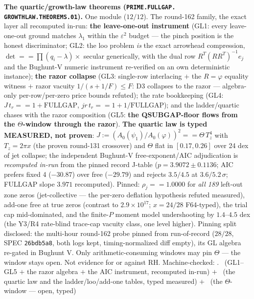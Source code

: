 \par\smallskip\noindent\textbf{The quartic/growth-law theorems
(\texttt{PRIME.\allowbreak FULLGAP.\allowbreak
GROWTHLAW.\allowbreak THEOREMS.01}).}
One module ($12/12$).  The round-162 family, the exact layer all
recomputed in-run: \textbf{the leave-one-out instrument} (GL1:
every leave-one-out ground matches $\lambda_1$ within the
$\varepsilon^2$ budget --- the pinch position is the honest
discriminator; GL2: the loo problem \emph{is} the exact arrowhead
compression, $\det == \prod(q_i - \lambda) \times$ secular
generically, with the dual row $R^T(RR^T)^{-1}e_j$ and the
Bughunt-V numeric instrument re-verified on an own deterministic
instance); \textbf{the razor collapse} (GL3: single-row
interlacing $+$ the $R = \varphi$ equality witness $+$ razor
vacuity $1/(s + 1/F) \le F$: D3 collapses to the razor ---
algebra-only per-row/per-zero price bounds refuted); the rate
bookkeeping (GL4: $J\,t_r == 1 + \mathrm{FULLGAP}$, $jr\,t_r ==
1 + 1/\mathrm{FULLGAP}$); and the ladder/quartic chases with the
razor composition (GL5: \textbf{the QSUBGAP-floor flows from the
$\Theta$-window through the razor}).  \textbf{The quartic law is
typed MEASURED, not proven}: $J := (A_0(\psi_1)/A_0(\varphi))^2
== \Theta\,T_z^4$ with $T_z = 2\pi x$ (the proven round-131
crossover) and $\Theta$ flat in $[0.17, 0.26]$ over 24 dex of
jet collapse; the independent Bughunt-V free-exponent/AIC
adjudication is \emph{recomputed in-run} from the pinned record
J-table ($p = 3.9072 \pm 0.1136$; AIC prefers fixed 4 ($-30.87$)
over free ($-29.79$) and rejects $3.5/4.5$ at $3.6/5.2\,\sigma$;
FULLGAP slope $3.971$ recomputed).  Pinned: $\rho_j == 1.0000$
for \emph{all 189} left-out zone zeros (jet-collective --- the
per-zero deflation hypothesis refuted measured), add-one free at
true zeros (contrast to $2.9\times10^{17}$; $x = 24/28$
F64-typed), the trial cap mid-dominated, and the finite-$P$
moment model undershooting by $1.4$--$4.5$ dex (the Y3/R4
rate-blind trace-cap vacuity class, one level higher).  Pinning
split disclosed: the multi-hour round-162 probe pinned from
run-of-record ($28/28$, SPEC \texttt{26bdb5a8}, both logs kept,
timing-normalized diff empty), its GL algebra re-gated in
Bughunt V.  Only arithmetic-consuming windows may pin $\Theta$
--- the window stays open.  Not evidence for or against RH.
Machine-checked: .
\mE\ (GL1--GL5 $+$ the razor algebra $+$ the AIC instrument,
recomputed in-run) $+$ \mC\ (the quartic law and the
ladder/loo/add-one tables, typed measured) $+$ \mO\ (the
$\Theta$-window --- open, typed)
\par\smallskip


